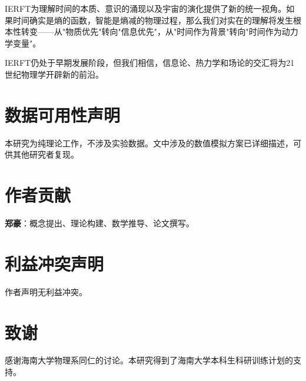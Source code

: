 \documentclass[12pt,a4paper]{article}
\begin{document}
IERFT为理解时间的本质、意识的涌现以及宇宙的演化提供了新的统一视角。如果时间确实是熵的函数，智能是熵减的物理过程，那么我们对实在的理解将发生根本性转变——从"物质优先"转向"信息优先"，从"时间作为背景"转向"时间作为动力学变量"。

IERFT仍处于早期发展阶段，但我们相信，信息论、热力学和场论的交汇将为21世纪物理学开辟新的前沿。

\section*{数据可用性声明}

本研究为纯理论工作，不涉及实验数据。文中涉及的数值模拟方案已详细描述，可供其他研究者复现。

\section*{作者贡献}

\textbf{郑豪}：概念提出、理论构建、数学推导、论文撰写。

\section*{利益冲突声明}

作者声明无利益冲突。

\section*{致谢}

感谢海南大学物理系同仁的讨论。本研究得到了海南大学本科生科研训练计划的支持。
\end{document}

